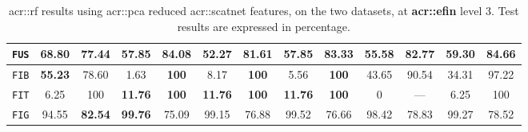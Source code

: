 \begin{sidewaystable}[htpb]
\begin{center}
\begin{tabular}{| c | c c | c c | c c | c c | c c | c c |}
                        \hline
                        \texttt{FUS} & \textbf{68.80} & 77.44 & 57.85 & 84.08 & 52.27 & 81.61 & 57.85 & 83.33 & 55.58 & 82.77 & 59.30 & \textbf{84.66} \\
                        \hline
                        \texttt{FIB} & \textbf{55.23} & 78.60 & 1.63 & \textbf{100} & 8.17 & \textbf{100} & 5.56 & \textbf{100} & 43.65 & 90.54 & 34.31 & 97.22 \\
                        \hline
                        \texttt{FIT} & 6.25 & 100 & \textbf{11.76} & \textbf{100} & \textbf{11.76} & \textbf{100} & \textbf{11.76} & \textbf{100} & 0 & --- & 6.25 & 100 \\
                        \hline
                        \texttt{FIG} & 94.55 & \textbf{82.54} & \textbf{99.76} & 75.09 & 99.15 & 76.88 & 99.52 & 76.66 & 98.42 & 78.83 & 99.27 & 78.52 \\
                        \hline
                    \end{tabular}
                \end{center}
                \caption{
                    \label{tab::stats_scat_pca_rf_f3}
                    \gls{acr::rf} results using \gls{acr::pca} reduced \gls{acr::scatnet} features, on the two datasets, at \textbf{\gls{acr::efin}} level 3.
                    Test results are expressed in percentage.
                }
            \end{sidewaystable}

